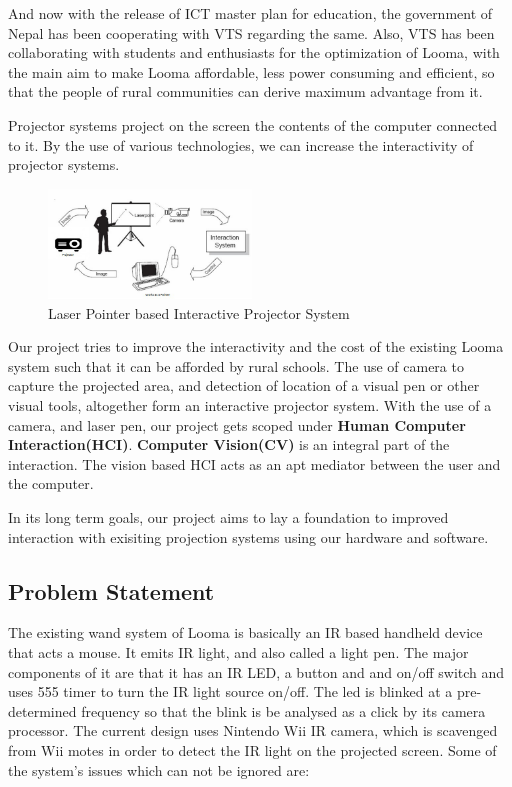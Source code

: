 \documentclass[12pt, a4paper]{article}
\begin{document}
And now with the release of ICT master plan for education, the government
of Nepal has been cooperating with VTS regarding the same. Also, VTS
has been collaborating with students and enthusiasts for the optimization of
Looma, with the main aim to make Looma affordable, less power consuming
and efficient, so that the people of rural communities can derive maximum
advantage from it.

Projector systems project on the screen the contents of the computer connected to it. By the use of various technologies, we can increase the interactivity of projector systems. 

\begin{figure}
	\centering
		\includegraphics[width=0.48\textwidth]{abc.jpg}
	\caption{Laser Pointer based Interactive Projector System}
\end{figure}

Our project tries to improve the interactivity and the cost of the existing Looma system such that it can be afforded by rural schools. The use of camera to capture the projected area, and detection of location of a visual pen or other visual tools, altogether form an interactive projector system. With the use of a camera, and laser pen, our project gets scoped under \textbf{Human Computer Interaction(HCI)}. \textbf{Computer Vision(CV)} is an integral part of the interaction. The vision based HCI acts as an apt mediator between the user and the computer.

In its long term goals, our project aims to lay a foundation to improved interaction with exisiting projection systems using our hardware and software. 

\subsection{Problem Statement}
The existing wand system of Looma is basically an IR based handheld device that acts a mouse. It emits IR light, and also called a light pen. The major components of it are that it has an IR LED, a button and and on/off switch and uses 555 timer to turn the IR light source on/off. The led is blinked at a pre-determined frequency so that the blink is be analysed as a click by its camera processor. The current design uses Nintendo Wii IR camera, which is scavenged from Wii motes in order to detect the IR light on the projected screen. Some of the system's issues which can not be ignored are:
\end{document}
